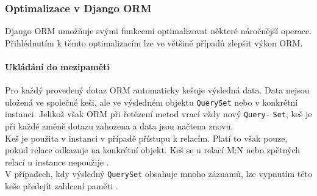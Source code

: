\documentclass[ing,male,java,dept456]{diploma}						%
\begin{document}
\subsubsection{Optimalizace v Django ORM}
\label{subsubsec:DjangoOpt}

Django ORM umožňuje svými funkcemi optimalizovat některé náročnější operace. Přihlédnutím k těmto optimalizacím lze ve většině případů zlepšit výkon ORM. 

\paragraph{Ukládání do mezipaměti}

Pro každý provedený dotaz ORM automaticky kešuje výsledná data. Data nejsou uložená ve společné keši, ale ve výsledném objektu \lstinline[style=inlinepython]|QuerySet| nebo v konkrétní instanci. Jelikož však ORM při řetězení metod vrací vždy nový \lstinline[style=inlinepython]|Query-| \lstinline[style=inlinepython]|Set|, keš je při každé změně dotazu zahozena a data jsou načtena znovu. \\
Keš je použita v instanci v případě přístupu k relacím. Platí to však pouze, pokud relace odkazuje na konkrétní objekt. Keš se u relací M:N nebo zpětných relací u instance nepoužije \cite{dj-queries}. \\
V případech, kdy výsledný \lstinline[style=inlinepython]|QuerySet| obsahuje mnoho záznamů, lze vypnutím této keše předejít zahlcení paměti \cite{dj-querysets}. %
\end{document}
